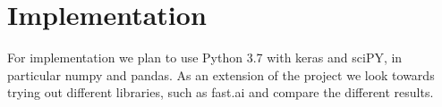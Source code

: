 \section{Implementation}
For implementation we plan to use Python 3.7 with keras\cite{KERAS} and sciPY\cite{SCIPY}, in particular numpy and pandas. 
As an extension of the project we look towards trying out different libraries, such as fast.ai\cite{FASTAI} and compare the different results.

